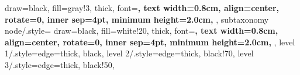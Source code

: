 {{        draw=black,
        fill=gray!3, %
        thick,
        font=\bfseries\large, %
        text width=0.8cm, %
        align=center, %
        rotate=0, %
        inner sep=4pt,
        minimum height=2.0cm,
    },
    subtaxonomy node/.style={ %
        draw=black,
        fill=white!20, %
        thick,
        font=\bfseries\large, %
        text width=0.8cm, %
        align=center, %
        rotate=0, %
        inner sep=4pt,
        minimum height=2.0cm,
    },
    level 1/.style={edge={thick, black}},
    level 2/.style={edge={thick, black!70}},
    level 3/.style={edge={thick, black!50}},
}


